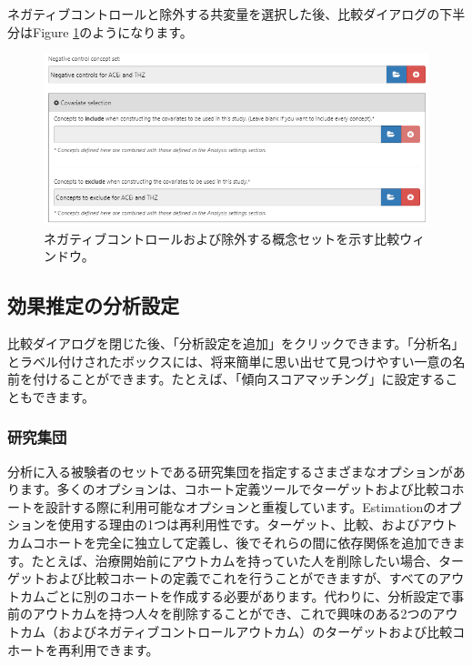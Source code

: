 \documentclass[
  11pt]{book}
\theoremstyle{definition}
\theoremstyle{definition}
\theoremstyle{definition}
\theoremstyle{definition}
\theoremstyle{remark}
\begin{document}
ネガティブコントロールと除外する共変量を選択した後、比較ダイアログの下半分はFigure \ref{fig:comparisons2}のようになります。

\begin{figure}

{\centering \includegraphics[width=1\linewidth]{images/PopulationLevelEstimation/comparisons2} 

}

\caption{ネガティブコントロールおよび除外する概念セットを示す比較ウィンドウ。}\label{fig:comparisons2}
\end{figure}

\subsection{効果推定の分析設定}\label{ux52b9ux679cux63a8ux5b9aux306eux5206ux6790ux8a2dux5b9a}

比較ダイアログを閉じた後、「分析設定を追加」をクリックできます。「分析名」とラベル付けされたボックスには、将来簡単に思い出せて見つけやすい一意の名前を付けることができます。たとえば、「傾向スコアマッチング」に設定することもできます。

\subsubsection*{研究集団}\label{ux7814ux7a76ux96c6ux56e3}

分析に入る被験者のセットである研究集団を指定するさまざまなオプションがあります。多くのオプションは、コホート定義ツールでターゲットおよび比較コホートを設計する際に利用可能なオプションと重複しています。Estimationのオプションを使用する理由の1つは再利用性です。ターゲット、比較、およびアウトカムコホートを完全に独立して定義し、後でそれらの間に依存関係を追加できます。たとえば、治療開始前にアウトカムを持っていた人を削除したい場合、ターゲットおよび比較コホートの定義でこれを行うことができますが、すべてのアウトカムごとに別のコホートを作成する必要があります。代わりに、分析設定で事前のアウトカムを持つ人々を削除することができ、これで興味のある2つのアウトカム（およびネガティブコントロールアウトカム）のターゲットおよび比較コホートを再利用できます。
\end{document}
